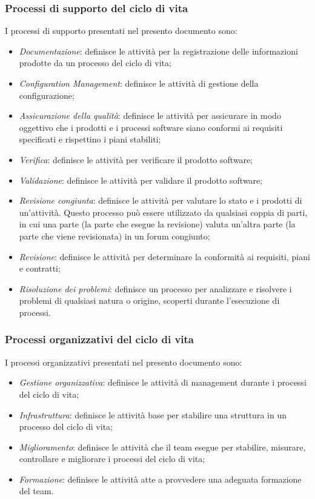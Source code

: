 \documentclass[10pt, a4paper]{article}
\begin{document}
\subsubsection{Processi di supporto del ciclo di vita}
I processi di supporto presentati nel presento documento sono:
\begin{itemize}
    \item \textit{Documentazione}: definisce le attività per la registrazione delle informazioni prodotte da un processo del ciclo di vita;
    \item \textit{Configuration Management}: definisce le attività di gestione della configurazione;
    \item \textit{Assicurazione della qualità}: definisce le attività per assicurare in modo oggettivo che i prodotti e i processi software
    siano conformi ai requisiti specificati e rispettino i piani stabiliti;
    \item \textit{Verifica}: definisce le attività per verificare il prodotto software;
    \item \textit{Validazione}: definisce le attività per validare il prodotto software;
    \item \textit{Revisione congiunta}: definisce le attività per valutare lo stato e i prodotti di un'attività. Questo processo può essere 
    utilizzato da qualsiasi coppia di parti, in cui una parte (la parte che esegue la revisione) valuta un'altra parte (la parte che viene revisionata)
    in un forum congiunto;
    \item \textit{Revisione}: definisce le attività per determinare la conformità ai requisiti, piani e contratti;
    \item \textit{Risoluzione dei problemi}: definisce un processo per analizzare e risolvere i problemi di qualsiasi natura o origine, scoperti
    durante l'esecuzione di processi.
\end{itemize}

\subsubsection{Processi organizzativi del ciclo di vita}
I processi organizzativi presentati nel presento documento sono:
\begin{itemize}
    \item \textit{Gestione organizzativa}: definisce le attività di management durante i processi del ciclo di vita;
    \item \textit{Infrastruttura}: definisce le attività base per stabilire una struttura in un processo del ciclo di vita;
    \item \textit{Miglioramento}: definisce le attività che il team esegue per stabilire, misurare, controllare e migliorare i processi del ciclo di vita;
    \item \textit{Formazione}: definisce le attività atte a provvedere una adeguata formazione del team.
\end{itemize}
\end{document}
